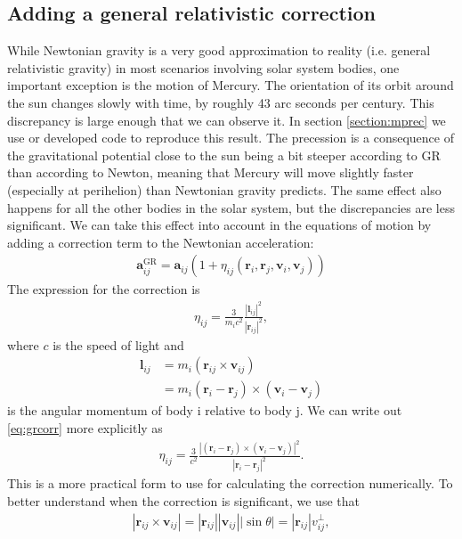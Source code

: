 \documentclass{article}
\newcommand{\lrp}[1]{\left(#1\right)}
\newcommand{\mb}[1]{\mathbf{#1}}
\begin{document}
\subsection{Adding a general relativistic correction} \label{section:gcorr}
While Newtonian gravity is a very good approximation to reality (i.e. general relativistic gravity) in most scenarios involving solar system bodies, one important exception is the motion of Mercury. The orientation of its orbit around the sun changes slowly with time, by roughly 43 arc seconds per century. This discrepancy is large enough that we can observe it. In section \ref{section:mprec} we use or developed code to reproduce this result. The precession is a consequence of the gravitational potential close to the sun being a bit steeper according to GR than according to Newton, meaning that Mercury will move slightly faster (especially at perihelion) than Newtonian gravity predicts. The same effect also happens for all the other bodies in the solar system, but the discrepancies are less significant. We can take this effect into account in the equations of motion by adding a correction term to the Newtonian acceleration:
\begin{align*}
    \mb{a}_{ij}^\text{GR} = \mb{a}_{ij}\lrp{1 + \eta_{ij}\lrp{\mb{r}_i, \mb{r}_j, \mb{v}_i, \mb{v}_j}}
\end{align*}
The expression for the correction is
\begin{align}
    \eta_{ij} = \frac{3}{m_i c^2}\frac{{|\mb{l}_{ij}|}^2}{{|\mb{r}_{ij}|}^2}, \label{eq:grcorr}
\end{align}
where $c$ is the speed of light and 
\begin{align*}
    \mb{l}_{ij} &= m_i\lrp{\mb{r}_{ij} \times \mb{v}_{ij}} \\
    &= m_i\lrp{\mb{r}_i - \mb{r}_j} \times \lrp{\mb{v}_i - \mb{v}_j}
\end{align*}
is the angular momentum of body i relative to body j. We can write out \eqref{eq:grcorr} more explicitly as
\begin{align*}
    \eta_{ij} = \frac{3}{c^2}\frac{{|\lrp{\mb{r}_i - \mb{r}_j} \times \lrp{\mb{v}_i - \mb{v}_j}|}^2}{{|\mb{r}_i - \mb{r}_j|}^2}.
\end{align*}
This is a more practical form to use for calculating the correction numerically. To better understand when the correction is significant, we use that
\begin{align*}
    |\mb{r}_{ij} \times \mb{v}_{ij}| = |\mb{r}_{ij}||\mb{v}_{ij}||\sin{\theta}| = |\mb{r}_{ij}|v_{ij}^\perp,
\end{align*}
\end{document}
